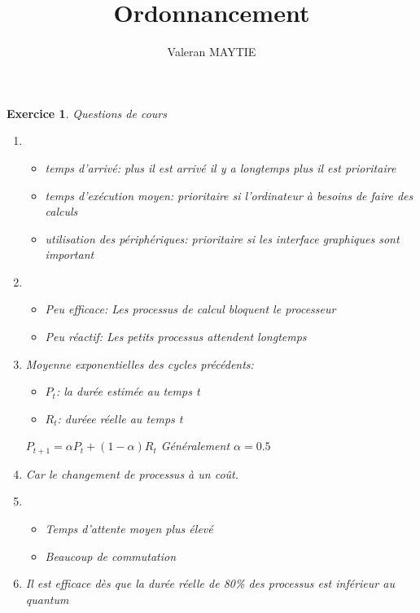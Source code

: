 \documentclass{article}
\title{\textbf{Ordonnancement}}
\date{}
\author{Valeran MAYTIE}
\theoremstyle{plain}
\newtheorem{exo}{Exercice}%
\begin{document}
\maketitle

\begin{exo} Questions de cours
\begin{enumerate}
    \item 
        \begin{itemize}
        \item temps d'arrivé: plus il est arrivé il y a 
            longtemps plus il est prioritaire 
        \item temps d'exécution moyen: prioritaire si l'ordinateur à 
            besoins de faire des calculs
        \item utilisation des périphériques: prioritaire si les interface 
            graphiques sont important
        \end{itemize}

    \item 
    \begin{itemize}
        \item Peu efficace: Les processus de calcul bloquent le processeur
        \item Peu réactif: Les petits processus attendent longtemps
    \end{itemize}

    \item Moyenne exponentielles des cycles précédents:
        \begin{itemize}[label=$\bullet$]
            \item $P_t$: la durée estimée au temps t
            \item $R_t$: duréee réelle au temps t
        \end{itemize}
        \begin{center}
            $P_{t+1} = \alpha P_t + (1 - \alpha)R_t$ \hspace{3cm} Généralement $\alpha = 0.5$
        \end{center}

    \item Car le changement de processus à un coût.
    \item 
        \begin{itemize}
            \item Temps d'attente moyen plus élevé
            \item Beaucoup de commutation
        \end{itemize}

    \item Il est efficace dès que la durée réelle de 80\% des processus est
        inférieur au quantum
\end{enumerate}
\end{exo}
\end{document}
